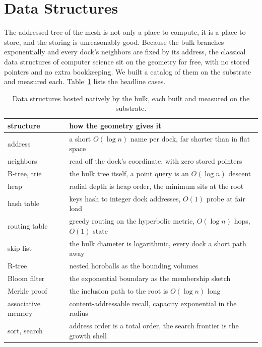\section{Data Structures}

The addressed tree of the mesh is not only a place to compute, it is a place to store, and the storing is unreasonably good. Because the bulk branches exponentially and every dock's neighbors are fixed by its address, the classical data structures of computer science sit on the geometry for free, with no stored pointers and no extra bookkeeping. We built a catalog of them on the substrate and measured each. Table~\ref{tab:data} lists the headline cases. \cite{pollard2026vibetest}

\begin{table}[ht]
\centering
\begin{tabular}{@{}lp{}@{}}
\toprule
structure & how the geometry gives it \\
\midrule
address & a short $O(\log n)$ name per dock, far shorter than in flat space \\
neighbors & read off the dock's coordinate, with zero stored pointers \\
B-tree, trie & the bulk tree itself, a point query is an $O(\log n)$ descent \\
heap & radial depth is heap order, the minimum sits at the root \\
hash table & keys hash to integer dock addresses, $O(1)$ probe at fair load \\
routing table & greedy routing on the hyperbolic metric, $O(\log n)$ hops, $O(1)$ state \\
skip list & the bulk diameter is logarithmic, every dock a short path away \\
R-tree & nested horoballs as the bounding volumes \\
Bloom filter & the exponential boundary as the membership sketch \\
Merkle proof & the inclusion path to the root is $O(\log n)$ long \\
associative memory & content-addressable recall, capacity exponential in the radius \\
sort, search & address order is a total order, the search frontier is the growth shell \\
\bottomrule
\end{tabular}
\caption{Data structures hosted natively by the bulk, each built and measured on the substrate.}
\label{tab:data}
\end{table}

